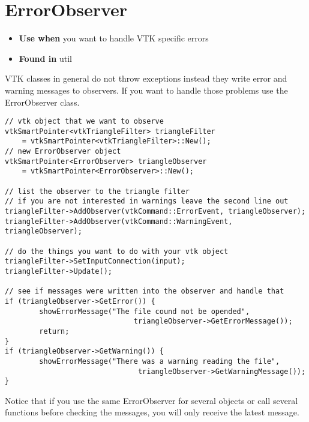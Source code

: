\section{ErrorObserver}
\label{sec:ErrorObserver}

\begin{itemize}
	\item \textbf{Use when} you want to handle VTK specific errors
	\item \textbf{Found in} util
\end{itemize}

VTK classes in general do not throw exceptions instead they write error and warning messages to observers. If you want to handle those problems use the ErrorObserver class.

\begin{lstlisting}[style=lstStyleCpp]
// vtk object that we want to observe
vtkSmartPointer<vtkTriangleFilter> triangleFilter 
	= vtkSmartPointer<vtkTriangleFilter>::New();
// new ErrorObserver object
vtkSmartPointer<ErrorObserver> triangleObserver 
	= vtkSmartPointer<ErrorObserver>::New();

// list the observer to the triangle filter
// if you are not interested in warnings leave the second line out
triangleFilter->AddObserver(vtkCommand::ErrorEvent, triangleObserver);
triangleFilter->AddObserver(vtkCommand::WarningEvent, triangleObserver);

// do the things you want to do with your vtk object
triangleFilter->SetInputConnection(input);
triangleFilter->Update();

// see if messages were written into the observer and handle that
if (triangleObserver->GetError()) {
        showErrorMessage("The file cound not be opended", 
        				      triangleObserver->GetErrorMessage());
        return;
}
if (triangleObserver->GetWarning()) {
        showErrorMessage("There was a warning reading the file",
        				       triangleObserver->GetWarningMessage());
}
\end{lstlisting}

Notice that if you use the same ErrorObserver for several objects or call several functions before checking the messages, you will only receive the latest message. 
